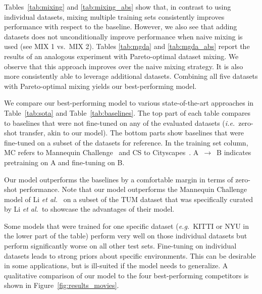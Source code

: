 Tables~\ref{tab:mixing} and \ref{tab:mixing_abs} show that, in contrast to using individual datasets, mixing multiple training sets consistently improves performance with respect to the baseline. However, we also see that adding datasets does not unconditionally improve performance when naive mixing is used (see MIX 1 vs.\ MIX 2). Tables \ref{tab:mgda} and \ref{tab:mgda_abs} report the results of an analogous experiment with Pareto-optimal dataset mixing. We observe that this approach improves over the naive mixing strategy. It is also more consistently able to leverage additional datasets. Combining all five datasets with Pareto-optimal mixing yields our best-performing model. 

 We compare our best-performing model to various state-of-the-art approaches in Table~\ref{tab:sota} and Table~\ref{tab:baselines}. The top part of each table compares to baselines that were not fine-tuned on any of the evaluated datasets (\MakeLowercase{\textit{i.e.}}\ zero-shot transfer, akin to our model). The bottom parts show baselines that were fine-tuned on a subset of the datasets for reference. In the training set column, MC refers to Mannequin Challenge~\cite{Li2019} and CS to Cityscapes~\cite{Cordts2016}.
\mbox{A $\rightarrow$ B} indicates pretraining on A and fine-tuning on B.

Our model outperforms the baselines by a comfortable margin in terms of zero-shot performance. Note that our model outperforms the Mannequin Challenge model of Li \MakeLowercase{\textit{et al.}}~\cite{Li2019} on a subset of the TUM dataset that was specifically curated by Li \MakeLowercase{\textit{et al.}}\ to showcase the advantages of their model.

Some models that were trained for one specific dataset (\MakeLowercase{\textit{e.g.}}\ KITTI or NYU in the lower part of the table) perform very well on those individual datasets but perform significantly worse on all other test sets. Fine-tuning on individual datasets leads to strong priors about specific environments. This can be desirable in some applications, but is ill-suited if the model needs to generalize. A qualitative comparison of our model to the four best-performing competitors is shown in Figure~\ref{fig:results_movies}.

